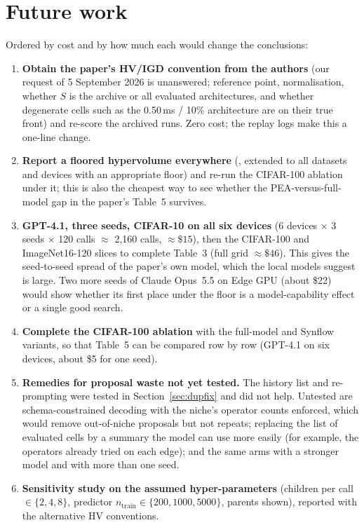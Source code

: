 \section{Future work}\label{sec:future}
Ordered by cost and by how much each would change the conclusions:
\begin{enumerate}
  \item \textbf{Obtain the paper's HV/IGD convention from the authors} (our request of 5 September 2026 is unanswered; reference point, normalisation, whether $S$ is the archive or all evaluated architectures, and whether degenerate cells such as the 0.50\,ms / 10\% architecture are on their true front) and re-score the archived runs. Zero cost; the replay logs make this a one-line change.
  \item \textbf{Report a floored hypervolume everywhere} (, extended to all datasets and devices with an appropriate floor) and re-run the CIFAR-100 ablation under it; this is also the cheapest way to see whether the PEA-versus-full-model gap in the paper's Table~5 survives.
  \item \textbf{GPT-4.1, three seeds, CIFAR-10 on all six devices} (6 devices $\times$ 3 seeds $\times$ 120 calls $\approx$ 2{,}160 calls, $\approx\$15$), then the CIFAR-100 and ImageNet16-120 slices to complete Table~3 (full grid $\approx\$46$). This gives the seed-to-seed spread of the paper's own model, which the local models suggest is large. Two more seeds of Claude Opus~5.5 on Edge GPU (about \$22) would show whether its first place under the floor is a model-capability effect or a single good search.
  \item \textbf{Complete the CIFAR-100 ablation} with the full-model and Synflow variants, so that Table~5 can be compared row by row (GPT-4.1 on six devices, about \$5 for one seed).
  \item \textbf{Remedies for proposal waste not yet tested.} The history list and re-prompting were tested in Section~\ref{sec:dupfix} and did not help. Untested are schema-constrained decoding with the niche's operator counts enforced, which would remove out-of-niche proposals but not repeats; replacing the list of evaluated cells by a summary the model can use more easily (for example, the operators already tried on each edge); and the same arms with a stronger model and with more than one seed.
  \item \textbf{Sensitivity study on the assumed hyper-parameters} (children per call $\in\{2,4,8\}$, predictor $n_{\text{train}}\in\{200,1000,5000\}$, parents shown), reported with the alternative HV conventions.

\end{enumerate}
